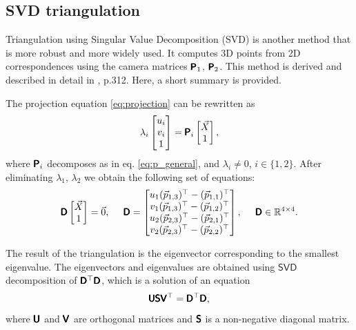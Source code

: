\subsection{SVD triangulation}
\label{sec:svdtriang}
Triangulation using Singular Value Decomposition (SVD) is another method that is more robust and more widely used.
It computes 3D points from 2D correspondences using the camera matrices $\pmb{\mathsf{P}}_1$, $\pmb{\mathsf{P}}_2$. 
This method is derived and described in detail in \cite{hartley_zisserman_2004}, p.312. Here, a short summary is provided.

The projection equation \eqref{eq:projection} can be rewritten as
\begin{equation}
    \lambda_i \begin{bmatrix} 
        u_i \\ v_i \\ 1 \end{bmatrix} = \pmb{\mathsf{P}}_i
    \begin{bmatrix} \vec{X} \\ 1
    \end{bmatrix},
\end{equation} 
where $\pmb{\mathsf{P}}_i$ decomposes as in eq. \eqref{eq:p_general}, and $\lambda_i \neq 0$, $i \in \{1, 2\}$.
After eliminating $\lambda_1$, $\lambda_2$ we obtain the following set of equations:
\begin{equation}
    \pmb{\mathsf{D}} \begin{bmatrix} \vec{X} \\ 1 \end{bmatrix} = \vec{0}, \;\;\;\;\;
    \pmb{\mathsf{D}} = \begin{bmatrix}
        u_1 (\vec{p}_{1, 3})^\top - (\vec{p}_{1, 1})^\top \\
        v_1 (\vec{p}_{1, 3})^\top - (\vec{p}_{1, 2})^\top \\
        u_2 (\vec{p}_{2, 3})^\top - (\vec{p}_{2, 1})^\top \\
        v_2 (\vec{p}_{2, 3})^\top - (\vec{p}_{2, 2})^\top \\
    \end{bmatrix}, \;\;\;\;\; \pmb{\mathsf{D}} \in \mathbb{R}^{4 \times 4}.
\end{equation}

The result of the triangulation is the eigenvector corresponding to the smallest eigenvalue.
The eigenvectors and eigenvalues are obtained using $\mathsf{SVD}$ decomposition of $\pmb{\mathsf{D}}^\top\pmb{\mathsf{D}}$, which is a solution of an equation
\begin{equation}
    \pmb{\mathsf{U}}\pmb{\mathsf{S}}\pmb{\mathsf{V}}^\top = \pmb{\mathsf{D}}^\top\pmb{\mathsf{D}},
\end{equation}
where $\pmb{\mathsf{U}}$ and $\pmb{\mathsf{V}}$ are orthogonal matrices and $\pmb{\mathsf{S}}$ is a non-negative diagonal matrix.

